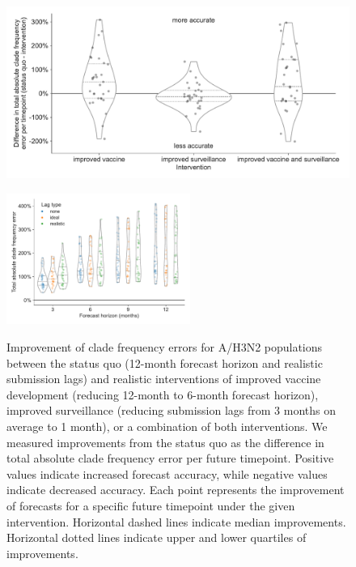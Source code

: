 \documentclass[9pt,lineno]{elife}
\begin{document}
\begin{figure}[htb!]
\includegraphics[width=\linewidth]{figures/h3n2_effects_of_realistic_interventions}
\caption{Improvement of clade frequency errors for A/H3N2 populations between the status quo (12-month forecast horizon and realistic submission lags) and realistic interventions of improved vaccine development (reducing 12-month to 6-month forecast horizon), improved surveillance (reducing submission lags from 3 months on average to 1 month), or a combination of both interventions.
  We measured improvements from the status quo as the difference in total absolute clade frequency error per future timepoint.
  Positive values indicate increased forecast accuracy, while negative values indicate decreased accuracy.
  Each point represents the improvement of forecasts for a specific future timepoint under the given intervention.
  Horizontal dashed lines indicate median improvements.
  Horizontal dotted lines indicate upper and lower quartiles of improvements.}
\label{fig:h3n2_effects_of_realistic_interventions}
%
{\includegraphics[width=6cm]{figures/h3n2_total_absolute_forecast_frequency_errors_by_delay_and_horizon}}\label{figsupp:h3n2_total_absolute_clade_frequency_errors}

\end{figure}
\end{document}

